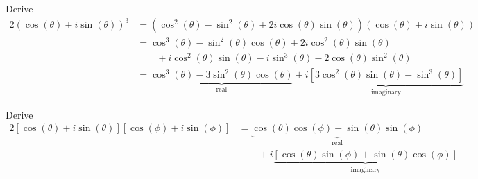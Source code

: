 \documentclass[a4paper]{article}
\begin{document}
Derive
\begin{alignat*}{2}
	\!\left( \cos\left( \theta  \right) + i \sin\left( \theta  \right) \right)^{3} & = \!\left( \cos^{2}\left( \theta  \right) - \sin^{2}\left( \theta  \right) + 2i \cos\left( \theta  \right) \sin\left( \theta  \right) \right) \!\left( \cos\left( \theta  \right) + i \sin\left( \theta  \right) \right)  \\
	 & = \cos^{3}\left( \theta  \right) - \sin^{2}\left( \theta  \right) \cos\left( \theta  \right) + 2i \cos^{2}\left( \theta  \right) \sin\left( \theta  \right) \\ 
	 & \qquad + i \cos^{2}\left( \theta  \right) \sin\left( \theta  \right) - i \sin^{3}\left( \theta  \right) - 2 \cos\left( \theta  \right) \sin^{2}\left( \theta  \right) \\
	 & = \underbrace{\cos^{3}\left( \theta  \right) - 3 \sin^{2}\left( \theta  \right) \cos\left( \theta  \right) }_{\text{real}} + i \underbrace{\!\left[ 3 \cos^{2}\left( \theta  \right) \sin\left( \theta  \right) - \sin^{3}\left( \theta  \right) \right] }_{\text{imaginary}}
\end{alignat*}


Derive
\begin{alignat*}{2}
	\!\left[ \cos\left( \theta  \right) + i \sin\left( \theta  \right) \right] \!\left[ \cos\left( \phi  \right) + i \sin\left( \phi  \right) \right]  & = \underbrace{\cos\left( \theta  \right)\cos\left( \phi  \right) - \sin\left( \theta  \right)\sin\left( \phi  \right)}_{\text{real}} \\
																			   & \qquad + i \underbrace{\!\left[ \cos\left( \theta  \right) \sin\left( \phi  \right) + \sin\left( \theta  \right) \cos\left( \phi  \right) \right]}_{\text{imaginary}}  \\
\end{alignat*}

\end{document}
